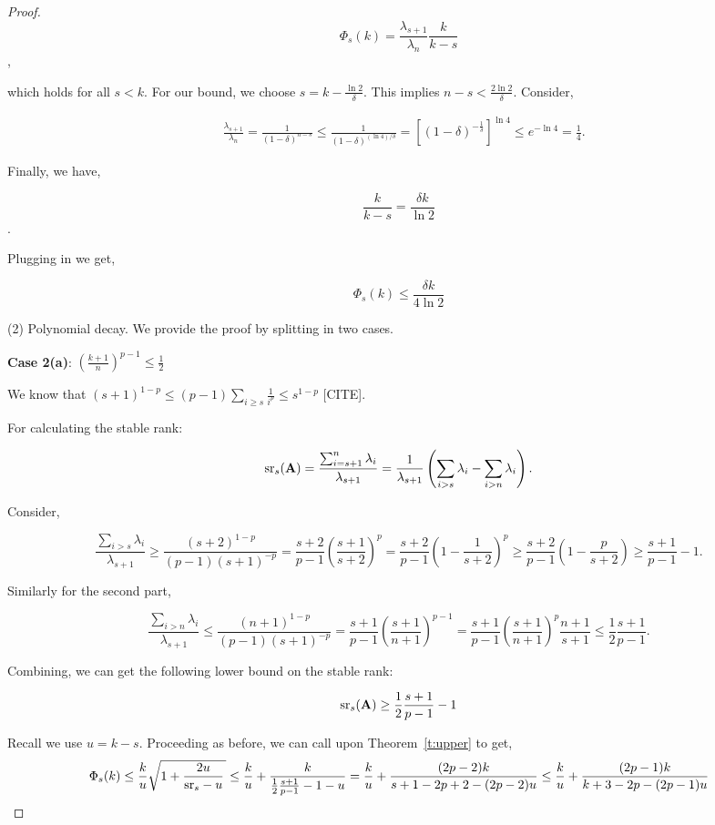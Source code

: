 \documentclass{article}
\begin{document}
\begin{proof}
	\[\Phi_s(k) = \frac{\lambda_{s+1}}{\lambda_n} \frac{k}{k-s}\],
	
	which holds for all $s <k$. For our bound, we choose $s = k- \frac{\ln 2}{\delta}$. This implies $n-s < \frac{2\ln 2}{\delta}$. Consider,
	
	\begin{align*}
	& \frac{\lambda_{s+1}}{\lambda_n}  = \frac{1}{(1-\delta)^{n-s}} \leq \frac{1}{(1-\delta)^{(\ln 4)/\delta}} = \left[(1-\delta)^{-\frac{1}{\delta}}\right] ^ {\ln 4} \leq e^{- \ln 4} = \frac{1}{4}. 
	\end{align*}
	
	Finally, we have,
	
	\[\frac{k}{k-s} = \frac{\delta k}{\ln 2}\].
	
	Plugging in we get,
	
	\[\Phi_s(k) \leq \frac{\delta k}{4 \ln 2} \]
	
	
	(2) Polynomial decay. We provide the proof by splitting in two cases. 
	

	\textbf{Case 2(a)}: $\left(\frac{k+1}{n}\right)^{p-1} \leq \frac{1}{2}$
	
	 We know that $(s+1)^{1-p} \leq (p-1)\sum_{i\geq s}\frac{1}{i^p} \leq s^{1-p} $ [CITE].
	
	For calculating the stable rank:
	
	\[ {\mathrm{sr}}_s(\mathbf A) = \frac{\sum_{i=s+1}^n \lambda_i}{\lambda_{s+1}} =\frac1{\lambda_{s+1}} \left( \sum_{i > s} \lambda_i - \sum_{i > n} \lambda_i \right).\]
	
	Consider,
	 
	\[ \frac{\sum_{i>s} \lambda_i}{\lambda_{s+1}} \geq \frac{(s+2)^{1-p}}{(p-1) (s+1)^{-p}} = \frac{s+2}{p-1} \left(\frac{s+1}{s+2}\right)^p =  \frac{s+2}{p-1} \left(1 - \frac1{s+2}\right)^p  \geq \frac{s+2}{p-1}(1 - \frac{p}{s+2}) \geq \frac{s+1}{p-1} -1 .\]
	
	Similarly for the second part, 
	
	\[\frac{\sum_{i>n} \lambda_i}{\lambda_{s+1}} \leq \frac{(n+1)^{1-p}}{(p-1) (s+1)^{-p}} = \frac{s+1}{p-1}\left(\frac{s+1}{n+1}\right)^{p-1} =\frac{s+1}{p-1}\left(\frac{s+1}{n+1}\right)^{p}\frac{n+1}{s+1} \leq \frac{1}{2} \frac{s+1}{p-1} . \] 
	
	Combining, we can get the following lower bound on the stable rank:
	
	\[{\mathrm{sr}}_s(\mathbf A) \geq \frac{1}{2} \frac{s+1}{p-1} -1  \]
	
	Recall we use $u = k-s$. Proceeding as before, we can call upon Theorem~\ref{t:upper} to get, 
	\[ \Phi_s(k) \leq \frac{k}{u}\sqrt{1+\frac{2u}{ {\mathrm{sr}}_s-u }\,} \leq  \frac{k}{u} + \frac{k}{  \frac{1}{2} \frac{s+1}{p-1} - 1 - u } = \frac{k}{u} + \frac{(2p-2)k}{   s+1 -2 p +2 - (2p-2)u } \leq \frac{k}{u} + \frac{(2p-1)k}{   k+3 -2 p  - (2p-1)u } \]
	

\end{proof}
\end{document}
